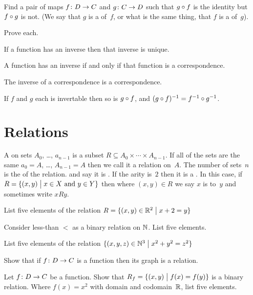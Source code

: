 \documentclass{ibl}
\begin{document}
\begin{ex}
  Find a pair of maps $\mbox{$f\colon D\to C$}$ and $\mbox{$g\colon C\to D$}$
  such that $g\mathbin{\circ} f$ is the identity but $f\mathbin{\circ} g$
  is not.
  (We say that $g$ is a  of~$f$, or what is the
  same thing, that $f$ is a  of~$g$).
\end{ex}

\begin{ex} Prove each.
\begin{exes}
\item If a function has an inverse then that inverse
  is unique.
\item A function has an inverse if and only if that 
  function is a correspondence.
\item The inverse of a correspondence is a correspondence.  
\item If $f$ and $g$ each is invertable then so is 
  $g\mathbin{\circ} f$, and $(g\mathbin{\circ} f)^{-1}=f^{-1}\mathbin{\circ} g^{-1}$.
\end{exes}  
\end{ex}





\section{Relations}
\begin{df}
A  on sets $A_0$, \ldots, $a_{n-1}$ is a subset
$R\subseteq A_0\times \cdots \times A_{n-1}$. 
If all of the sets are the same $a_0=A$, \ldots, $A_{n-1}=A$
then we call it a relation on~$A$.
The number of sets~$n$ is the  of the relation.
and say it is .
If the arity is~$2$ then it is a .
In this case, if $R=\{(x,y) \bigm| \text{$x\in X$ and $y\in Y$}\}$
then where $(x,y)\in R$ we say $x$ is  to~$y$
and sometimes write $xRy$.
\end{df}

\begin{ex}
\begin{exes}
\item List five elements of the relation
  $R=\{(x,y)\in \mathbb{R}^2 \bigm| x+2=y\}$
\item Consider less-than $<$ as a binary relation on $\mathbb{N}$.
  List five elements.
\item List five elements of the relation
  $\{(x,y,z)\in\mathbb{N}^3 \bigm| x^2+y^2=z^2\}$
\item Show that if $\mbox{$f\colon D\to C$}$ is a function then 
  its graph is a relation.
\item Let $\mbox{$f\colon D\to C$}$ be a function.
  Show that 
  $R_f=\{(x,y) \bigm| f(x)=f(y)\}$
  is a binary relation.
  Where $f(x)=x^2$ with domain and codomain~$\mathbb{R}$,
  list five elements. 
\end{exes}
\end{ex}
\end{document}
